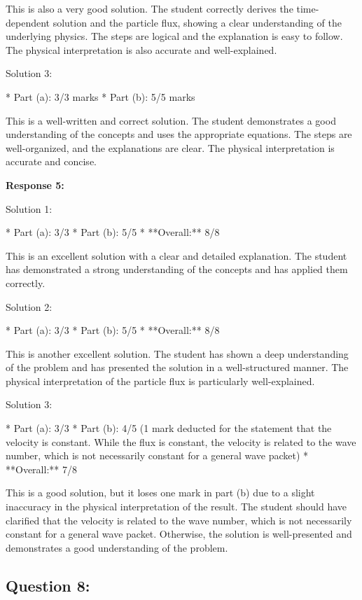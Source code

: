 \documentclass[a4paper,11pt]{article}
\begin{document}
This is also a very good solution. The student correctly derives the time-dependent solution and the particle flux, showing a clear understanding of the underlying physics. The steps are logical and the explanation is easy to follow. The physical interpretation is also accurate and well-explained.

Solution 3:

*   Part (a): 3/3 marks
*   Part (b): 5/5 marks

This is a well-written and correct solution. The student demonstrates a good understanding of the concepts and uses the appropriate equations. The steps are well-organized, and the explanations are clear. The physical interpretation is accurate and concise.

\bigskip    
\textbf{Response 5:}

Solution 1:

*   Part (a): 3/3
*   Part (b): 5/5
*   **Overall:** 8/8

This is an excellent solution with a clear and detailed explanation. The student has demonstrated a strong understanding of the concepts and has applied them correctly.

Solution 2:

*   Part (a): 3/3
*   Part (b): 5/5
*   **Overall:** 8/8

This is another excellent solution. The student has shown a deep understanding of the problem and has presented the solution in a well-structured manner. The physical interpretation of the particle flux is particularly well-explained.

Solution 3:

*   Part (a): 3/3
*   Part (b): 4/5 (1 mark deducted for the statement that the velocity is constant. While the flux is constant, the velocity is related to the wave number, which is not necessarily constant for a general wave packet)
*   **Overall:** 7/8

This is a good solution, but it loses one mark in part (b) due to a slight inaccuracy in the physical interpretation of the result. The student should have clarified that the velocity is related to the wave number, which is not necessarily constant for a general wave packet. Otherwise, the solution is well-presented and demonstrates a good understanding of the problem.

\subsection*{Question 8:}
\end{document}
